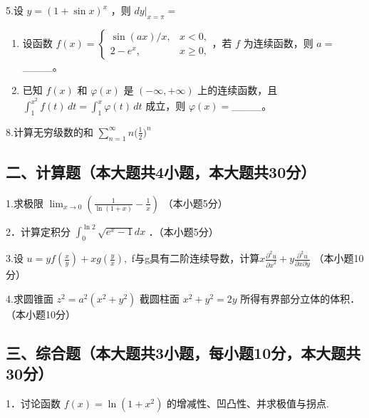 \documentclass[11pt,fontset=fandol]{ctexart}
\begin{document}
5.设 \(y = ( 1 + \sin x ) ^ { x }\) ，则
\(\left. d y \right| _ { x = \pi } =\)

\begin{enumerate}
\def\labelenumi{\arabic{enumi}.}
\setcounter{enumi}{5}
\item
  设函数
  \(f(x)=\begin{cases}\sin(ax)/x,&x<0,\\2-e^x,&x\geq0,\end{cases}\)，若
  \(f\) 为连续函数，则 \(a=\)\_\_\_\_。
\item
  已知 \(f(x)\) 和 \(\varphi(x)\) 是 \((-\infty,+\infty)\)
  上的连续函数，且 \(\int_1^{x^2}f(t)\,dt=\int_1^x\varphi(t)\,dt\)
  成立，则 \(\varphi(x)=\)\_\_\_\_。
\end{enumerate}

8.计算无穷级数的和
\(\sum _ { n = 1 } ^ { \infty } n { \Bigg ( } { \frac { 1 } { 2 } } { \Bigg ) } ^ { n }\)

\subsection{二、计算题（本大题共4小题，本大题共30分）}\label{ux4e8cux8ba1ux7b97ux9898ux672cux5927ux9898ux51714ux5c0fux9898ux672cux5927ux9898ux517130ux5206}

1.求极限
\(\lim _ { x \to 0 } \left( { \frac { 1 } { \ln ( 1 + x ) } } - { \frac { 1 } { x } } \right)\)
（本小题5分）

2．计算定积分
\(\int _ { 0 } ^ { \ln 2 } { \sqrt { e ^ { x } - 1 } } d x\)
．（本小题5分）

3.设
\(u = y f { \left( { \frac { x } { y } } \right) } + x g { \left( { \frac { y } { x } } \right) } ,\)
f与g具有二阶连续导数，计算\(x \frac { \partial ^ { 2 } u } { { \partial x } ^ { 2 } } + y \frac { \partial ^ { 2 } u } { { \partial x } { \partial y } }\)
（本小题10分）

4.求圆锥面 \(z ^ { 2 } = a ^ { 2 } ( x ^ { 2 } + y ^ { 2 } )\) 截圆柱面
\(x ^ { 2 } + y ^ { 2 } = 2 y\) 所得有界部分立体的体积．（本小题10分）

\subsection{三、综合题（本大题共3小题，每小题10分，本大题共30分）}\label{ux4e09ux7efcux5408ux9898ux672cux5927ux9898ux51713ux5c0fux9898ux6bcfux5c0fux989810ux5206ux672cux5927ux9898ux517130ux5206}

1．讨论函数 \(f ( x ) = \ln ( 1 + x ^ { 2 } )\)
的增减性、凹凸性、并求极值与拐点.
\end{document}
